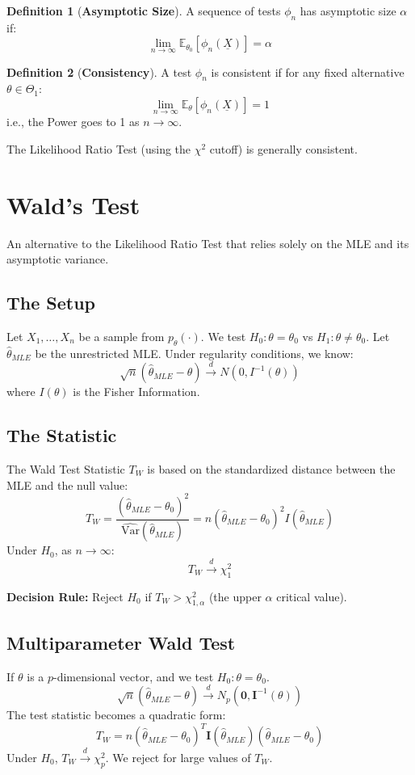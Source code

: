 \documentclass[12pt, a4paper]{article}
\theoremstyle{definition}
\newtheorem{definition}{Definition}
\newcommand{\E}{\mathbb{E}}
\newcommand{\Var}{\text{Var}}
\newcommand{\Xvec}{\underline{X}}
\begin{document}
\begin{definition}[\textbf{Asymptotic Size}]
A sequence of tests $\phi_n$ has asymptotic size $\alpha$ if:
$$ \lim_{n \to \infty} \E_{\theta_0}[\phi_n(\Xvec)] = \alpha $$
\end{definition}

\begin{definition}[\textbf{Consistency}]
A test $\phi_n$ is consistent if for any fixed alternative $\theta \in \Theta_1$:
$$ \lim_{n \to \infty} \E_{\theta}[\phi_n(\Xvec)] = 1 $$
i.e., the Power goes to 1 as $n \to \infty$.
\end{definition}

The Likelihood Ratio Test (using the $\chi^2$ cutoff) is generally consistent.

\section{Wald's Test}

An alternative to the Likelihood Ratio Test that relies solely on the MLE and its asymptotic variance.

\subsection{The Setup}
Let $X_1, \dots, X_n$ be a sample from $p_\theta(\cdot)$.
We test $H_0: \theta = \theta_0$ vs $H_1: \theta \neq \theta_0$.
Let $\hat{\theta}_{MLE}$ be the unrestricted MLE.
Under regularity conditions, we know:
$$ \sqrt{n}(\hat{\theta}_{MLE} - \theta) \xrightarrow{d} N(0, I^{-1}(\theta)) $$
where $I(\theta)$ is the Fisher Information.

\subsection{The Statistic}
The Wald Test Statistic $T_W$ is based on the standardized distance between the MLE and the null value:
$$ T_W = \frac{(\hat{\theta}_{MLE} - \theta_0)^2}{\widehat{\Var}(\hat{\theta}_{MLE})} = n(\hat{\theta}_{MLE} - \theta_0)^2 I(\hat{\theta}_{MLE}) $$
Under $H_0$, as $n \to \infty$:
$$ T_W \xrightarrow{d} \chi^2_1 $$

\textbf{Decision Rule:}
Reject $H_0$ if $T_W > \chi^2_{1, \alpha}$ (the upper $\alpha$ critical value).

\subsection{Multiparameter Wald Test}
If $\theta$ is a $p$-dimensional vector, and we test $H_0: \theta = \theta_0$.
$$ \sqrt{n}(\hat{\theta}_{MLE} - \theta) \xrightarrow{d} N_p(\mathbf{0}, \mathbf{I}^{-1}(\theta)) $$
The test statistic becomes a quadratic form:
$$ T_W = n (\hat{\theta}_{MLE} - \theta_0)^T \mathbf{I}(\hat{\theta}_{MLE}) (\hat{\theta}_{MLE} - \theta_0) $$
Under $H_0$, $T_W \xrightarrow{d} \chi^2_p$.
We reject for large values of $T_W$.
\end{document}
